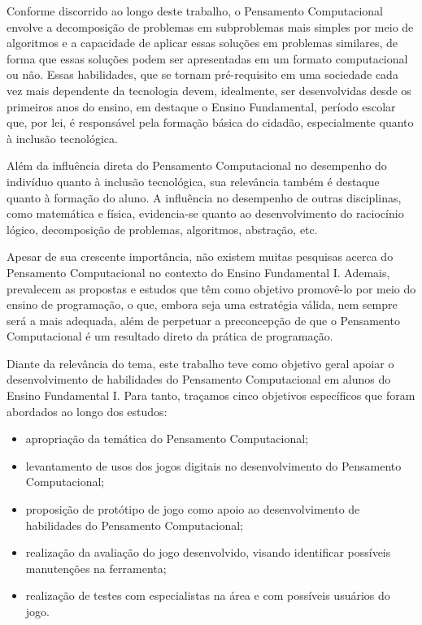Conforme discorrido ao longo deste trabalho, o Pensamento Computacional envolve a decomposição de problemas em subproblemas mais simples por meio de algoritmos e a capacidade de aplicar essas soluções em problemas similares, de forma que essas soluções podem ser apresentadas em um formato computacional ou não. Essas habilidades, que se tornam pré-requisito em uma sociedade cada vez mais dependente da tecnologia devem, idealmente, ser desenvolvidas desde os primeiros anos do ensino, em destaque o Ensino Fundamental, período escolar que, por lei, é responsável pela formação básica do cidadão, especialmente quanto à inclusão tecnológica.

Além da influência direta do Pensamento Computacional no desempenho do indivíduo quanto à inclusão tecnológica, sua relevância também é destaque quanto à formação do aluno. A influência no desempenho de outras disciplinas, como matemática e física, evidencia-se quanto ao desenvolvimento do raciocínio lógico, decomposição de problemas, algoritmos, abstração, etc.

Apesar de sua crescente importância, não existem muitas pesquisas acerca do Pensamento Computacional no contexto do Ensino Fundamental I. Ademais, prevalecem as propostas e estudos que têm como objetivo promovê-lo por meio do ensino de programação, o que, embora seja uma estratégia válida, nem sempre será a mais adequada, além de perpetuar a preconcepção de que o Pensamento Computacional é um resultado direto da prática de programação. 

Diante da relevância do tema, este trabalho teve como objetivo geral apoiar o desenvolvimento de habilidades do Pensamento Computacional em alunos do Ensino Fundamental I. Para tanto, traçamos cinco objetivos específicos que foram abordados ao longo dos estudos: 

\begin{itemize}
	\item apropriação da temática do Pensamento Computacional;
	\item levantamento de usos dos jogos digitais no desenvolvimento do Pensamento Computacional;
	\item proposição de protótipo de jogo como apoio ao desenvolvimento de habilidades do Pensamento Computacional;
	\item realização da avaliação do jogo desenvolvido, visando identificar possíveis manutenções na ferramenta;
	\item realização de testes com especialistas na área e com possíveis usuários do jogo.
\end{itemize}

